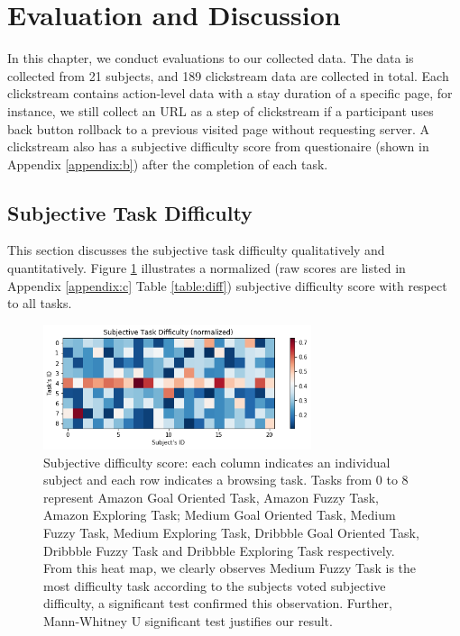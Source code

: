\section{Evaluation and Discussion}
\label{ch:eval}

In this chapter, we conduct evaluations to our collected data.
The data is collected from 21 subjects, and 189 clickstream data are collected in total. 
Each clickstream contains action-level data with a stay duration
of a specific page, for instance, we still collect an URL as a step of clickstream 
if a participant uses back button rollback to a previous visited page without requesting server. 
A clickstream also has a subjective difficulty score from questionaire (shown in Appendix \ref{appendix:b}) 
after the completion of each task.

\subsection{Subjective Task Difficulty}

This section discusses the subjective task difficulty qualitatively and quantitatively.
Figure \ref{fig:difficulty} illustrates a normalized (raw scores are listed in 
Appendix \ref{appendix:c} Table \ref{table:diff}) subjective difficulty score 
with respect to all tasks.

\begin{figure}[H]
    \centering
    \includegraphics[width=0.7\textwidth]{figures/difficulty}
    \caption{Subjective difficulty score: each column indicates an individual subject and
    each row indicates a browsing task. Tasks from 0 to 8 represent Amazon Goal Oriented Task,
    Amazon Fuzzy Task, Amazon Exploring Task; Medium Goal Oriented Task, Medium Fuzzy Task,
    Medium Exploring Task, Dribbble Goal Oriented Task, Dribbble Fuzzy Task and Dribbble Exploring Task
    respectively.
    From this heat map, we clearly observes Medium Fuzzy Task is the most difficulty task
    according to the subjects voted subjective difficulty, a significant test confirmed this observation.
    Further, Mann-Whitney U significant test justifies our result.}
    \label{fig:difficulty}
\end{figure}

